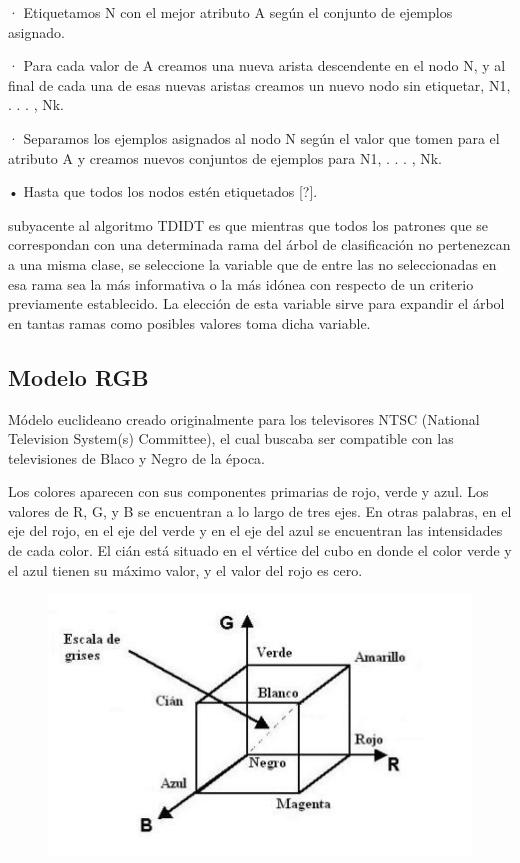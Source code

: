 \documentclass[10pt]{article}
\begin{document}
· Etiquetamos N con el mejor atributo A según el conjunto de
ejemplos asignado.
\setlength{\parskip}{2mm}

· Para cada valor de A creamos una nueva arista descendente en el nodo N, y al final de cada una de esas nuevas aristas creamos un nuevo nodo sin etiquetar, N1, . . . , Nk.

\setlength{\parskip}{2mm}

· Separamos los ejemplos asignados al nodo N según el valor que tomen para el atributo A y creamos nuevos conjuntos de ejemplos para N1, . . . , Nk.

\setlength{\parskip}{2mm}

• Hasta que todos los nodos estén etiquetados [?].

subyacente al algoritmo TDIDT es que mientras que todos los patrones que se correspondan con una determinada rama del árbol de clasificación no pertenezcan a una misma clase, se seleccione la variable que de entre las no seleccionadas en esa rama sea la más informativa o la más idónea con respecto de un criterio previamente establecido. La elección de esta variable sirve para expandir el árbol en tantas ramas como posibles valores toma dicha variable.

\subsection{Modelo RGB}

Módelo euclideano creado originalmente para los televisores NTSC (National Television System(s) Committee), el cual buscaba ser compatible con las televisiones de Blaco y Negro de la época. 
\cite{IEEEreferencias:Ref2}

Los colores aparecen con sus componentes primarias de rojo, verde y azul. Los valores de R, G, y B se encuentran a lo largo de tres ejes. En otras palabras, en el eje del rojo, en el eje del verde y en el eje del azul se encuentran las intensidades de cada color. El cián está situado en el vértice del cubo en donde el color verde y el azul tienen su máximo valor, y el valor del rojo es cero.

\begin{figure}[H]
	\begin{center}
\includegraphics[scale = 0.85]{Imagenes/cubo.JPG}
	\end{center} 
\end{figure}
\end{document}
